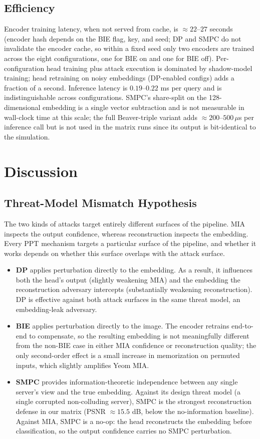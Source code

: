 \documentclass[conference]{IEEEtran}
\begin{document}
\subsection{Efficiency}
Encoder training latency, when not served from cache, is $\approx 22$--$27$ seconds (encoder hash depends on the BIE flag, key, and seed; DP and SMPC do not invalidate the encoder cache, so within a fixed seed only two encoders are trained across the eight configurations, one for BIE on and one for BIE off). Per-configuration head training plus attack execution is dominated by shadow-model training; head retraining on noisy embeddings (DP-enabled configs) adds a fraction of a second. Inference latency is $0.19$--$0.22$ ms per query and is indistinguishable across configurations. SMPC's share-split on the 128-dimensional embedding is a single vector subtraction and is not measurable in wall-clock time at this scale; the full Beaver-triple variant adds $\approx 200$--$500\,\mu$s per inference call but is not used in the matrix runs since its output is bit-identical to the simulation.

\section{Discussion}
\label{sec:discussion}

\subsection{Threat-Model Mismatch Hypothesis}
The two kinds of attacks target entirely different surfaces of the pipeline. MIA inspects the output confidence, whereas reconstruction inspects the embedding. Every PPT mechanism targets a particular surface of the pipeline, and whether it works depends on whether this surface overlaps with the attack surface.

\begin{itemize}
  \item \textbf{DP} applies perturbation directly to the embedding. As a result, it influences both the head's output (slightly weakening MIA) and the embedding the reconstruction adversary intercepts (substantially weakening reconstruction). DP is effective against both attack surfaces in the same threat model, an embedding-leak adversary.
  \item \textbf{BIE} applies perturbation directly to the image. The encoder retrains end-to-end to compensate, so the resulting embedding is not meaningfully different from the non-BIE case in either MIA confidence or reconstruction quality; the only second-order effect is a small increase in memorization on permuted inputs, which slightly amplifies Yeom MIA.
  \item \textbf{SMPC} provides information-theoretic independence between any single server's view and the true embedding. Against its design threat model (a single corrupted non-colluding server), SMPC is the strongest reconstruction defense in our matrix (PSNR $\approx 15.5$ dB, below the no-information baseline). Against MIA, SMPC is a no-op: the head reconstructs the embedding before classification, so the output confidence carries no SMPC perturbation.
\end{itemize}
\end{document}
